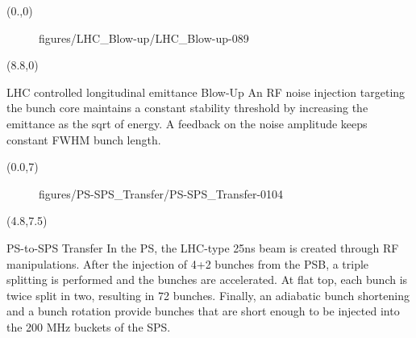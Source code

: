 \begin{frame}
		\begin{textblock}{8.8}(0.,0)
			\begin{figure}[h]
				 {figures/LHC_Blow-up/LHC_Blow-up-}{0}{89} %
			\end{figure}
		\end{textblock}
		\begin{textblock}{7.2}(8.8,0)
			\begin{block}{LHC controlled longitudinal emittance Blow-Up}
				An RF noise injection targeting the bunch core maintains a constant stability threshold by increasing the emittance as the sqrt of energy.	
				A feedback on the noise amplitude keeps constant FWHM bunch length.
			\end{block}
		\end{textblock}
		\begin{textblock}{4.8}(0.0,7)
			\begin{figure}[h]
				 {figures/PS-SPS_Transfer/PS-SPS_Transfer-}{0}{104} %
			\end{figure}
		\end{textblock}
		\begin{textblock}{11.2}(4.8,7.5)
			\begin{block}{PS-to-SPS Transfer}
				In the PS, the LHC-type 25ns beam is created through RF manipulations. After the injection of 4+2 bunches from the PSB, a triple splitting is performed and the bunches are accelerated. At flat top, each bunch is twice split in two, resulting in 72 bunches. Finally, an adiabatic bunch shortening and a bunch rotation provide bunches that are short enough to be injected into the 200 MHz buckets of the SPS.
			\end{block}
		\end{textblock}

\end{frame}


